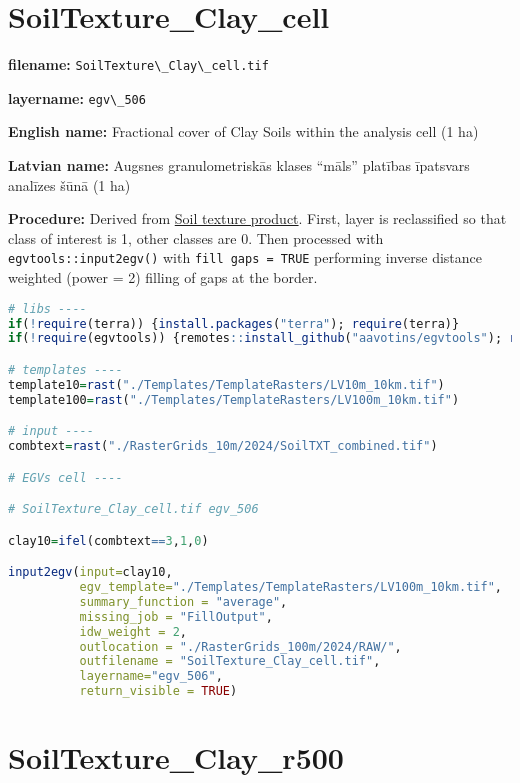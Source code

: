 \documentclass[
]{book}
\newcommand{\passthrough}[1]{#1}
\begin{document}
\section{SoilTexture\_Clay\_cell}\label{ch06.506}

\textbf{filename:} \passthrough{\lstinline!SoilTexture\_Clay\_cell.tif!}

\textbf{layername:} \passthrough{\lstinline!egv\_506!}

\textbf{English name:} Fractional cover of Clay Soils within the analysis cell (1 ha)

\textbf{Latvian name:} Augsnes granulometriskās klases ``māls'' platības īpatsvars analīzes šūnā (1 ha)

\textbf{Procedure:} Derived from \hyperref[Ch05.02]{Soil texture product}. First, layer is
reclassified so that class of interest is 1, other classes are 0. Then processed
with \passthrough{\lstinline!egvtools::input2egv()!} with \passthrough{\lstinline!fill gaps = TRUE!} performing inverse
distance weighted (power = 2) filling of gaps at the border.

\begin{lstlisting}[language=R]
# libs ----
if(!require(terra)) {install.packages("terra"); require(terra)}
if(!require(egvtools)) {remotes::install_github("aavotins/egvtools"); require(egvtools)}

# templates ----
template10=rast("./Templates/TemplateRasters/LV10m_10km.tif")
template100=rast("./Templates/TemplateRasters/LV100m_10km.tif")

# input ----
combtext=rast("./RasterGrids_10m/2024/SoilTXT_combined.tif")

# EGVs cell ----

# SoilTexture_Clay_cell.tif egv_506

clay10=ifel(combtext==3,1,0)

input2egv(input=clay10,
          egv_template="./Templates/TemplateRasters/LV100m_10km.tif",
          summary_function = "average",
          missing_job = "FillOutput",
          idw_weight = 2,
          outlocation = "./RasterGrids_100m/2024/RAW/",
          outfilename = "SoilTexture_Clay_cell.tif",
          layername="egv_506",
          return_visible = TRUE)
\end{lstlisting}

\section{SoilTexture\_Clay\_r500}\label{ch06.507}
\end{document}
